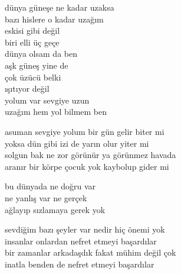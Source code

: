 \documentclass[10pt, openright, oneside]{memoir}
\theoremstyle{definition}
\begin{document}
\vspace*{\fill}
%
\newpage
{}
\vspace*{\fill}
\settowidth{\versewidth}{solgun bak ne zor görünür ya görünmez havada}
\begin{cverse}
  dünya güneşe ne kadar uzaksa \\
  bazı hislere o kadar uzağım \\
  eskisi gibi değil \\
  biri elli üç geçe \\
  dünya olsam da ben \\
  aşk güneş yine de \\
  çok üzücü belki \\
  ışıtıyor değil \\
  yolum var sevgiye uzun \\
  uzağım hem yol bilmem ben

  asuman sevgiye yolum bir gün gelir biter mi \\
  yoksa dün gibi izi de yarın olur yiter mi \\
  solgun bak ne zor görünür ya görünmez havada \\
  aranır bir körpe çocuk yok kaybolup gider mi
\end{cverse}
\vspace*{\fill}
%
\newpage
{}
\vspace*{\fill}
\settowidth{\versewidth}{ağlayıp sızlamaya gerek yok}
\begin{cverse}
  bu dünyada ne doğru var \\
  ne yanlış var ne gerçek \\
  ağlayıp sızlamaya gerek yok
\end{cverse}
\vspace*{\fill}
%
\newpage
{}
\vspace*{\fill}
\settowidth{\versewidth}{bir zamanlar arkadaşdık fakat mühim değil çok}
\begin{cverse}
  sevdiğim bazı şeyler var nedir hiç önemi yok \\
  insanlar onlardan nefret etmeyi başardılar \\
  bir zamanlar arkadaşdık fakat mühim değil çok \\
  inatla benden de nefret etmeyi başardılar
\end{cverse}
\vspace*{\fill}
%
\newpage
{}
\vspace*{\fill}
\end{document}
